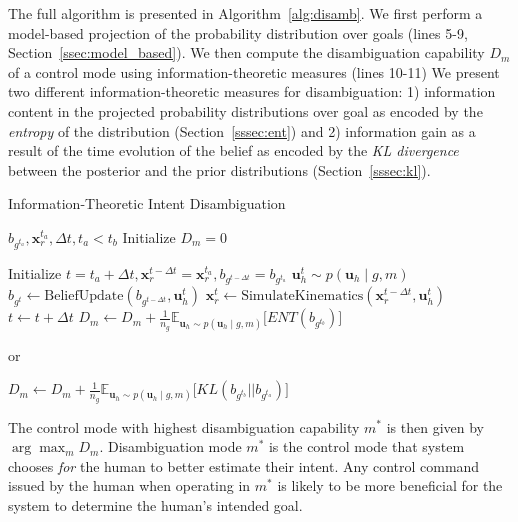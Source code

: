 \documentclass[letterpaper, 10 pt, conference]{ieeeconf}  %
\newcommand{\argmax}{\arg\!\max}
\begin{document}
The full algorithm is presented in Algorithm~\ref{alg:disamb}. We first perform a model-based projection of the probability distribution over goals (lines 5-9, Section~\ref{ssec:model_based}). We then compute the disambiguation capability $D_m$ of a control mode using information-theoretic measures (lines 10-11) We present two different information-theoretic measures for disambiguation: 1) information content in the projected probability distributions over goal as encoded by the \textit{entropy} of the distribution (Section~\ref{sssec:ent}) and 2) information gain as a result of the time evolution of the belief as encoded by the \textit{KL divergence} between the posterior and the prior distributions (Section~\ref{sssec:kl}). 

\begin{algorithm}[h]
	\caption{Information-Theoretic Intent Disambiguation}
	\label{alg:disamb}
	\begin{algorithmic}[1]
		\REQUIRE $b_{g^{t_a}}, \boldsymbol{x}_r^{t_a}, \Delta t, t_a < t_b$
		\STATE Initialize $D_m = 0$
		
		\STATE Initialize $t = t_a + \Delta t, \boldsymbol{x}_r^{t - \Delta t} = \boldsymbol{x}_r^{t_a}, b_{g^{t - \Delta t}} = b_{g^{t_a}}$
		\STATE $\boldsymbol{u}_h^t \sim p(\boldsymbol{u}_h\;|\; g, m)$ 
		\STATE $b_{g^{t}} \leftarrow \text{BeliefUpdate}(b_{g^{t-\Delta t}}, \boldsymbol{u}_h^t)$
		\STATE $\boldsymbol{x}_r^{t}\leftarrow \text{SimulateKinematics}(\boldsymbol{x}_r^{t-\Delta t}, \boldsymbol{u}_h^t)$
		\STATE $t \leftarrow t + \Delta t$
		\ENDWHILE
		\STATE $D_m \leftarrow D_m + \frac{1}{n_g} \mathbb{E}_{\boldsymbol{u}_h \sim p(\boldsymbol{u}_h \; | \; g, m)}\Big[ENT(b_{g^{t_b}})\Big]$
		
		or
		
		\STATE $D_m \leftarrow D_m + \frac{1}{n_g} \mathbb{E}_{\boldsymbol{u}_h \sim p(\boldsymbol{u}_h \; | \; g, m)}\Big[KL(b_{g^{t_b}}||b_{g^{t_a}})\Big]$
		\ENDFOR
		\ENDFOR
	\end{algorithmic}
\end{algorithm}
The control mode with highest disambiguation capability $m^*$ is then given by $\argmax_m D_m$. Disambiguation mode $m^*$ is the control mode that system chooses \textit{for} the human to better estimate their intent. Any control command issued by the human when operating in $m^*$ is likely to be more beneficial for the system to determine the human's intended goal. 
\end{document}
